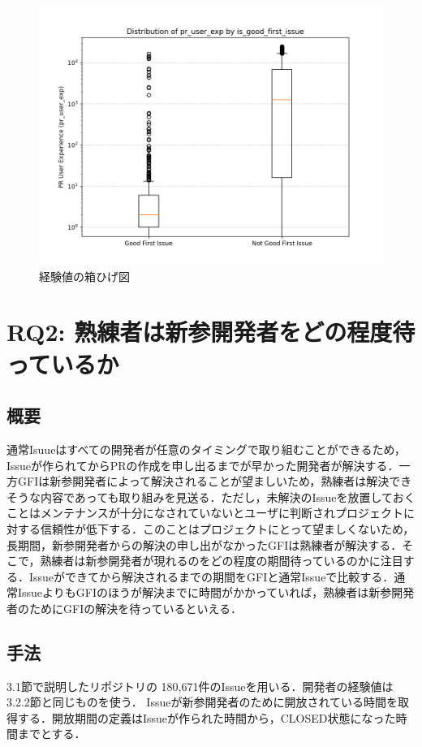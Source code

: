 \documentclass[11pt]{jreport}
\newcommand{\RQTwo}{熟練者は新参開発者をどの程度待っているか}
\newcommand{\NIssue}{180,671}
\begin{document}
\begin{figure}[t]
\centerline{\includegraphics[width=0.9\linewidth]{@BSthesis2024_Nakai/BSthesis2024_Nakai_fig/2025-02-03_11h12_00.png}}
\caption{経験値の箱ひげ図}
\label{fig:milestone}
\end{figure}


\section{RQ2: \RQTwo}

\subsection{概要}

通常Isuueはすべての開発者が任意のタイミングで取り組むことができるため，Issueが作られてからPRの作成を申し出るまでが早かった開発者が解決する．一方GFIは新参開発者によって解決されることが望ましいため，熟練者は解決できそうな内容であっても取り組みを見送る．ただし，未解決のIssueを放置しておくことはメンテナンスが十分になされていないとユーザに判断されプロジェクトに対する信頼性が低下する．このことはプロジェクトにとって望ましくないため，長期間，新参開発者からの解決の申し出がなかったGFIは熟練者が解決する．そこで，熟練者は新参開発者が現れるのをどの程度の期間待っているのかに注目する．Issueができてから解決されるまでの期間をGFIと通常Issueで比較する．通常IssueよりもGFIのほうが解決までに時間がかかっていれば，熟練者は新参開発者のためにGFIの解決を待っているといえる．

\subsection{手法}
3.1節で説明したリポジトリの \NIssue 件のIssueを用いる．開発者の経験値は3.2.2節と同じものを使う．
Issueが新参開発者のために開放されている時間を取得する．開放期間の定義はIssueが作られた時間から，CLOSED状態になった時間までとする．
\end{document}
